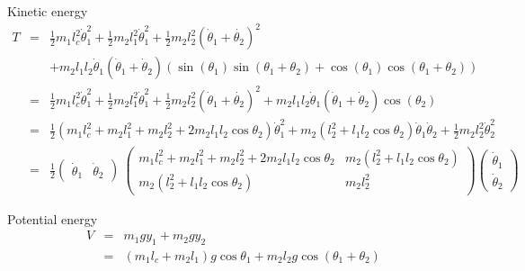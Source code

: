 \documentclass[a4paper]{article}
\begin{document}
Kinetic energy
\begin{eqnarray*}
T &=&\frac{1}{2} m_1 l_c^2 \dot{\theta}_1^2 + \frac{1}{2} m_2 l_1^2 \dot{\theta}_1^2
+ \frac{1}{2} m_2 l_2^2 (\dot{\theta}_1 + \dot{\theta_2})^2\\
&&+ m_2 l_1 l_2 \dot{\theta}_1(\dot{\theta}_1 + \dot{\theta}_2)
\left(\sin(\theta_1)\sin(\theta_1+\theta_2) + \cos(\theta_1)\cos(\theta_1+\theta_2)\right)\\
&=& \frac{1}{2} m_1 l_c^2 \dot{\theta}_1^2 + \frac{1}{2} m_2 l_1^2 \dot{\theta}_1^2
+ \frac{1}{2} m_2 l_2^2 (\dot{\theta}_1 + \dot{\theta_2})^2
+ m_2 l_1 l_2 \dot{\theta}_1(\dot{\theta}_1 + \dot{\theta}_2) \cos(\theta_2)\\
&=& \frac{1}{2} (m_1 l_c^2 + m_2 l_1^2 + m_2 l_2^2 + 2 m_2 l_1 l_2 \cos{\theta_2}) \dot{\theta}_1^2
+ m_2 (l_2^2 + l_1 l_2 \cos{\theta_2}) \dot{\theta}_1 \dot{\theta}_2
+ \frac{1}{2} m_2 l_2^2 \dot{\theta}_2^2\\
&=& \frac{1}{2}
\begin{pmatrix} \dot{\theta}_1 & \dot{\theta}_2 \end{pmatrix}\
\begin{pmatrix} m_1 l_c^2 + m_2 l_1^2 + m_2 l_2^2 + 2 m_2 l_1 l_2 \cos{\theta_2} &
    m_2 (l_2^2 + l_1 l_2 \cos{\theta_2})\\
    m_2 (l_2^2 + l_1 l_2 \cos{\theta_2}) &
    m_2 l_2^2 \end{pmatrix}
\begin{pmatrix} \dot{\theta}_1\\ \dot{\theta}_2 \end{pmatrix}
\end{eqnarray*}

Potential energy
\begin{eqnarray*}
V &=& m_1 g y_1 + m_2 g y_2\\
  &=& (m_1 l_c + m_2 l_1) g \cos{\theta_1} + m_2 l_2 g \cos(\theta_1 + \theta_2)
\end{eqnarray*}
\end{document}
